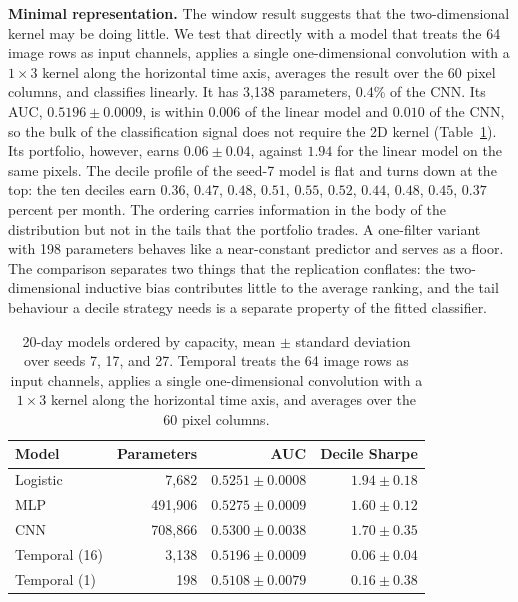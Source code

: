 \documentclass[10pt]{article}
\begin{document}
\textbf{Minimal representation.} The window result suggests that the two-dimensional kernel may be doing little. We test that directly with a model that treats the 64 image rows as input channels, applies a single one-dimensional convolution with a $1\times3$ kernel along the horizontal time axis, averages the result over the 60 pixel columns, and classifies linearly. It has 3{,}138 parameters, 0.4\% of the CNN. Its AUC, $0.5196\pm0.0009$, is within $0.006$ of the linear model and $0.010$ of the CNN, so the bulk of the classification signal does not require the 2D kernel (Table~\ref{tab:minimal}). Its portfolio, however, earns $0.06\pm0.04$, against $1.94$ for the linear model on the same pixels. The decile profile of the seed-7 model is flat and turns down at the top: the ten deciles earn $0.36$, $0.47$, $0.48$, $0.51$, $0.55$, $0.52$, $0.44$, $0.48$, $0.45$, $0.37$ percent per month. The ordering carries information in the body of the distribution but not in the tails that the portfolio trades. A one-filter variant with 198 parameters behaves like a near-constant predictor and serves as a floor. The comparison separates two things that the replication conflates: the two-dimensional inductive bias contributes little to the average ranking, and the tail behaviour a decile strategy needs is a separate property of the fitted classifier.

\begin{table}[h!]
\centering
\small
\caption{20-day models ordered by capacity, mean $\pm$ standard deviation over seeds 7, 17, and 27. Temporal treats the 64 image rows as input channels, applies a single one-dimensional convolution with a $1\times3$ kernel along the horizontal time axis, and averages over the 60 pixel columns.}
\label{tab:minimal}
\begin{tabular}{lrrr}
\toprule
Model & Parameters & AUC & Decile Sharpe \\
\midrule
Logistic      & 7{,}682   & $0.5251\pm0.0008$ & $1.94\pm0.18$ \\
MLP           & 491{,}906 & $0.5275\pm0.0009$ & $1.60\pm0.12$ \\
CNN           & 708{,}866 & $0.5300\pm0.0038$ & $1.70\pm0.35$ \\
Temporal (16) & 3{,}138   & $0.5196\pm0.0009$ & $0.06\pm0.04$ \\
Temporal (1)  & 198       & $0.5108\pm0.0079$ & $0.16\pm0.38$ \\
\bottomrule
\end{tabular}
\end{table}
\end{document}
